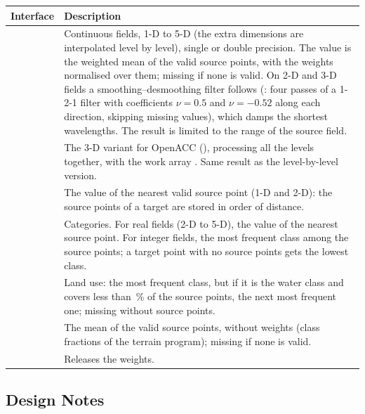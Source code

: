 \begin{longtable}{L{4.2cm} L{9.8cm}}
  \toprule
  \textbf{Interface} & \textbf{Description} \\
  \midrule
  \endhead
  \bottomrule
  \endfoot
   &
    Continuous fields, 1-D to 5-D (the extra dimensions are interpolated
    level by level), single or double precision. The value is the weighted
    mean of the valid source points, with the weights normalised over them;
    missing if none is valid. On 2-D and 3-D fields a smoothing--desmoothing
    filter follows (: four passes of a 1-2-1 filter with
    coefficients $\nu = 0.5$ and $\nu = -0.52$ along each direction,
    skipping missing values), which damps the shortest wavelengths. The
    result is limited to the range of the source field. \\
   &
    The 3-D variant for OpenACC (), processing all
    the levels together, with the work array . Same result as
    the level-by-level version. \\
   &
    The value of the nearest valid source point (1-D and 2-D): the source
    points of a target are stored in order of distance. \\
   &
    Categories. For real fields (2-D to 5-D), the value of the nearest
    source point. For integer fields, the most frequent class
    among the source points; a target point with no source points gets the
    lowest class. \\
   &
    Land use: the most frequent class, but if it is the water class
     and covers less than \,\% of the source points, the
    next most frequent one; missing without source points. \\
   &
    The mean of the valid source points, without weights (class fractions
    of the terrain program); missing if none is valid. \\
   &
    Releases the weights. \\
\end{longtable}

\subsection{Design Notes}

